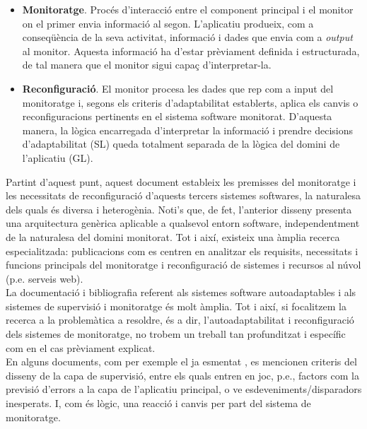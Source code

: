 \begin{itemize}
\item \textbf{Monitoratge}. Procés d'interacció entre el component principal i el monitor on el primer envia informació al segon. L'aplicatiu produeix, com a conseqüència de la seva activitat, informació i dades que envia com a \textit{output} al monitor. Aquesta informació ha d'estar prèviament definida i estructurada, de tal manera que el monitor sigui capaç d'interpretar-la.
\item \textbf{Reconfiguració}. El monitor procesa les dades que rep com a input del monitoratge i, segons els criteris d'adaptabilitat establerts, aplica els canvis o reconfiguracions pertinents en el sistema software monitorat. D'aquesta manera, la lògica encarregada d'interpretar la informació i prendre decisions d'adaptabilitat (SL) queda totalment separada de la lògica del domini de l'aplicatiu (GL).
\end{itemize}

Partint d'aquest punt, aquest document estableix les premisses del monitoratge i les necessitats de reconfiguració d’aquests tercers sistemes softwares, la naturalesa dels quals és diversa i heterogènia. Noti's que, de fet, l'anterior disseny presenta una arquitectura genèrica aplicable a qualsevol entorn software, independentment de la naturalesa del domini monitorat. Tot i així, existeix una àmplia recerca especialitzada: publicacions com \cite{napols} es centren en analitzar els requisits, necessitats i funcions principals del monitoratge i reconfiguració de sistemes i recursos al núvol (p.e. serveis web).\\

La documentació i bibliografia referent als sistemes software autoadaptables i als sistemes de supervisió i monitoratge és molt àmplia. Tot i així, si focalitzem la recerca a la problemàtica a resoldre, és a dir, l’autoadaptabilitat i reconfiguració dels sistemes de monitoratge, no trobem un treball tan profunditzat i específic com en el cas prèviament explicat.\\

En alguns documents, com per exemple el ja esmentat \cite{napols}, es mencionen criteris del disseny de la capa de supervisió, entre els quals entren en joc, p.e., factors com la previsió d’errors a la capa de l’aplicatiu principal, o ve esdeveniments/disparadors inesperats. I, com és lògic, una reacció i canvis per part del sistema de monitoratge. \\

